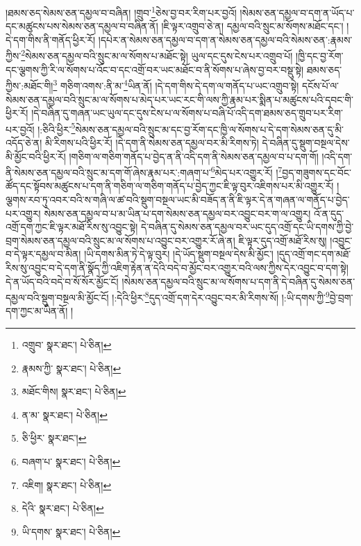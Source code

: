 །ཐམས་ཅད་སེམས་ཅན་དམྱལ་བ་བཞིན། །གྲུབ་\footnote{འགྲུབ་  སྣར་ཐང་།  པེ་ཅིན། }ཅེས་བྱ་བར་རིག་པར་བྱའོ། །སེམས་ཅན་དམྱལ་བ་དག་ན་ཡོད་པ་དང་མཚུངས་པས་སེམས་ཅན་དམྱལ་བ་བཞིན་ནོ། །ཇི་ལྟར་འགྲུབ་ཅེ་ན། དམྱལ་བའི་སྲུང་མ་སོགས་མཐོང་དང་། །དེ་དག་གིས་ནི་གནོད་ཕྱིར་རོ། །དཔེར་ན་སེམས་ཅན་དམྱལ་བ་དག་ན་སེམས་ཅན་དམྱལ་བའི་སེམས་ཅན་:རྣམས་ཀྱིས་\footnote{རྣམས་ཀྱི་  སྣར་ཐང་།  པེ་ཅིན། }སེམས་ཅན་དམྱལ་བའི་སྲུང་མ་ལ་སོགས་པ་མཐོང་སྟེ། ཡུལ་དང་དུས་ངེས་པར་འགྲུབ་པོ། །ཁྱི་དང་བྱ་རོག་དང་ལྕགས་ཀྱི་རི་ལ་སོགས་པ་འོང་བ་དང་འགྲོ་བར་ཡང་མཐོང་བ་ནི་སོགས་པ་ཞེས་བྱ་བར་བསྡུ་སྟེ། ཐམས་ཅད་ཀྱིས་:མཐོང་གི།\footnote{མཐོང་གིས།  སྣར་ཐང་།  པེ་ཅིན། } གཅིག་འགས་:ནི་མ་\footnote{ན་མ་  སྣར་ཐང་།  པེ་ཅིན། }ཡིན་ནོ། །དེ་དག་གིས་དེ་དག་ལ་གནོད་པ་ཡང་འགྲུབ་སྟེ། དངོས་པོ་ལ་སེམས་ཅན་དམྱལ་བའི་སྲུང་མ་ལ་སོགས་པ་མེད་པར་ཡང་རང་གི་ལས་ཀྱི་རྣམ་པར་སྨིན་པ་མཚུངས་པའི་དབང་གི་ཕྱིར་རོ། །དེ་བཞིན་དུ་གཞན་ཡང་ཡུལ་དང་དུས་ངེས་པ་ལ་སོགས་པ་བཞི་པོ་འདི་དག་ཐམས་ཅད་གྲུབ་པར་རིག་པར་བྱའོ། །:ཅིའི་ཕྱིར་\footnote{ཅི་ཕྱིར་  སྣར་ཐང་། }སེམས་ཅན་དམྱལ་བའི་སྲུང་མ་དང་བྱ་རོག་དང་ཁྱི་ལ་སོགས་པ་དེ་དག་སེམས་ཅན་དུ་མི་འདོད་ཅེ་ན། མི་རིགས་པའི་ཕྱིར་རོ། །དེ་དག་ནི་སེམས་ཅན་དམྱལ་བར་མི་རིགས་ཏེ། དེ་བཞིན་དུ་སྡུག་བསྔལ་དེས་མི་མྱོང་བའི་ཕྱིར་རོ། །གཅིག་ལ་གཅིག་གནོད་པ་བྱེད་ན་ནི་འདི་དག་ནི་སེམས་ཅན་དམྱལ་བ་པ་དག་གོ། །འདི་དག་ནི་སེམས་ཅན་དམྱལ་བའི་སྲུང་མ་དག་གོ་ཞེས་རྣམ་པར་:གཞག་པ་\footnote{བཞག་པ་  སྣར་ཐང་།  པེ་ཅིན། }མེད་པར་འགྱུར་རོ། །\footnote{འཇིག།  སྣར་ཐང་།  པེ་ཅིན། }བྱད་གཟུགས་དང་བོང་ཚོད་དང་སྟོབས་མཚུངས་པ་དག་ནི་གཅིག་ལ་གཅིག་གནོད་པ་བྱེད་ཀྱང་ཇི་ལྟ་བུར་འཇིགས་པར་མི་འགྱུར་རོ། །ལྕགས་རབ་ཏུ་འབར་བའི་ས་གཞི་ལ་ཚ་བའི་སྡུག་བསྔལ་ཡང་མི་བཟོད་ན་ནི་ཇི་ལྟར་དེ་ན་གཞན་ལ་གནོད་པ་བྱེད་པར་འགྱུར། སེམས་ཅན་དམྱལ་བ་པ་མ་ཡིན་པ་དག་སེམས་ཅན་དམྱལ་བར་འབྱུང་བར་ག་ལ་འགྱུར། འོ་ན་དུད་འགྲོ་དག་ཀྱང་ཇི་ལྟར་མཐོ་རིས་སུ་འབྱུང་སྟེ། དེ་བཞིན་དུ་སེམས་ཅན་དམྱལ་བར་ཡང་དུད་འགྲོ་དང་ཡི་དགས་ཀྱི་བྱེ་བྲག་སེམས་ཅན་དམྱལ་བའི་སྲུང་མ་ལ་སོགས་པ་འབྱུང་བར་འགྱུར་རོ་ཞེ་ན། ཇི་ལྟར་དུད་འགྲོ་མཐོ་རིས་སུ། །འབྱུང་བ་དེ་ལྟར་དམྱལ་བ་མིན། །ཡི་དགས་མིན་ཏེ་དེ་ལྟ་བུར། །དེ་ཡོད་སྡུག་བསྔལ་དེས་མི་མྱོང་། །དུད་འགྲོ་གང་དག་མཐོ་རིས་སུ་འབྱུང་བ་དེ་དག་ནི་སྣོད་ཀྱི་འཇིག་རྟེན་ན་དེའི་བདེ་བ་མྱོང་བར་འགྱུར་བའི་ལས་ཀྱིས་དེར་འབྱུང་བ་དག་སྟེ། དེ་ན་ཡོད་བའི་བདེ་བ་སོ་སོར་མྱོང་ངོ། །སེམས་ཅན་དམྱལ་བའི་སྲུང་མ་ལ་སོགས་པ་དག་ནི་དེ་བཞིན་དུ་སེམས་ཅན་དམྱལ་བའི་སྡུག་བསྔལ་མི་མྱོང་ངོ། །:དེའི་ཕྱིར་\footnote{དེའི་  སྣར་ཐང་།  པེ་ཅིན། }དུད་འགྲོ་དག་དེར་འབྱུང་བར་མི་རིགས་སོ། །:ཡི་དགས་ཀྱི་\footnote{ཡི་དགས་  སྣར་ཐང་།  པེ་ཅིན། }བྱེ་བྲག་དག་ཀྱང་མ་ཡིན་ནོ། །
